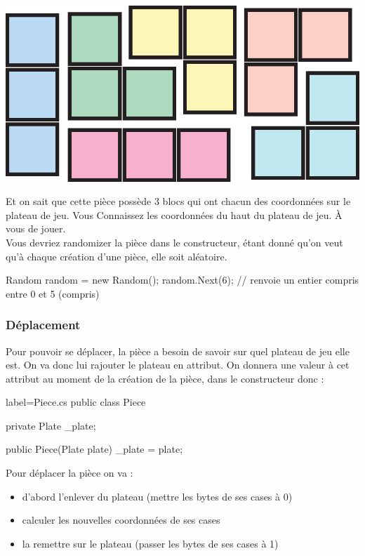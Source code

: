 \documentclass[a4paper]{article}
\begin{document}
    \begin{center}
        \includegraphics[scale=0.5]{img/pieces.eps}
    \end{center}
\endgroup

Et on sait que cette pièce possède 3 blocs qui ont chacun des coordonnées sur
le plateau de jeu. Vous Connaissez les coordonnées du haut du plateau de jeu.
À vous de jouer. \\

Vous devriez randomizer la pièce dans le constructeur, étant donné qu'on veut
qu'à chaque création d'une pièce, elle soit aléatoire. \\

\begin{csharpcode}
Random random = new Random();
random.Next(6); // renvoie un entier compris entre 0 et 5 (compris)
\end{csharpcode}

\subsubsection{Déplacement}

Pour pouvoir se déplacer, la pièce a besoin de savoir sur quel plateau de jeu
elle est. On va donc lui rajouter le plateau en attribut. On donnera une valeur
à cet attribut au moment de la création de la pièce, dans le constructeur donc : \\

\begin{csharpcode*}{label=Piece.cs}
public class Piece
{
    private Plate _plate;

    public Piece(Plate plate)
    {
        _plate = plate;
    }
}
\end{csharpcode*}

Pour déplacer la pièce on va :
\begin{itemize}
    \item d'abord l'enlever du plateau (mettre les bytes de ses cases à 0)
    \item calculer les nouvelles coordonnées de ses cases
    \item la remettre sur le plateau (passer les bytes de ses cases à 1)
\end{itemize}
\end{document}
